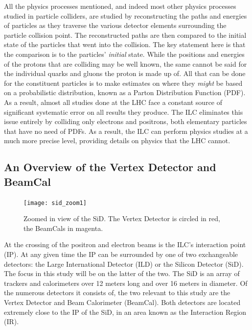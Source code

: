 \documentclass{report}
\begin{document}
                All the physics processes mentioned, and indeed most other physics processes studied in particle colliders, are studied by reconstructing the paths and energies of particles as they traverse the various detector elements surrounding the particle collision point. The reconstructed paths are then compared to the initial state of the particles that went into the collision. The key statement here is that the comparison is to the particles' \textit{initial} state. While the positions and energies of the protons that are colliding may be well known, the same cannot be said for the individual quarks and gluons the proton is made up of. All that can be done for the constituent particles is to make estimates on where they \textit{might} be based on a probabilistic distribution, known as a Parton Distribution Function (PDF). As a result, almost all studies done at the LHC face a constant source of significant systematic error on all results they produce. The ILC eliminates this issue entirely by colliding only electrons and positrons, both elementary particles that have no need of PDFs. As a result, the ILC can perform physics studies at a much more precise level, providing details on physics that the LHC cannot.

            \subsection{An Overview of the Vertex Detector and BeamCal}
                \begin{figure}[h] 
                    \texttt{[image: sid\_zoom1]}
                    \centering
                    \caption{Zoomed in view of the SiD.
                        The Vertex Detector is circled in red,
                        the BeamCals in magenta.}
                    \label{fig:sid_zoom1}
                \end{figure}

                At the crossing of the positron and electron beams is the ILC's interaction point (IP). At any given time the IP can be surrounded by one of two exchangeable detectors: the Large International Detector (ILD) or the Silicon Detector (SiD). The focus in this study will be on the latter of the two. The SiD is an array of trackers and calorimeters over 12 meters long and over 16 meters in diameter. Of the numerous detectors it consists of, the two relevant to this study are the Vertex Detector and Beam Calorimeter (BeamCal). Both detectors are located extremely close to the IP of the SiD, in an area known as the Interaction Region (IR). 
\end{document}
